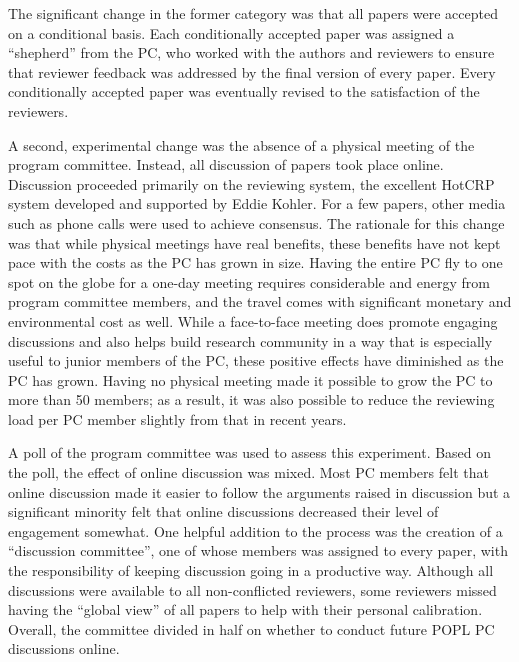 \documentclass[11pt]{article}
\begin{document}
The significant change in the former category was that all papers were
accepted on a conditional basis. Each conditionally accepted paper
was assigned a ``shepherd'' from the PC, who worked with the authors
and reviewers to ensure that reviewer feedback was addressed by the
final version of every paper. Every conditionally accepted paper was
eventually revised to the satisfaction of the reviewers.

A second, experimental change was the absence of a physical meeting of
the program committee. Instead, all discussion of papers took place
online. Discussion proceeded primarily on the reviewing system,
the excellent HotCRP system developed and supported by Eddie Kohler.
For a few papers, other media such as phone calls were used to achieve
consensus. The
rationale for this change was that while physical meetings have real
benefits, these benefits have not kept pace with the costs as the PC
has grown in size.  Having the entire PC fly to one spot on the globe
for a one-day meeting requires considerable and energy from program
committee members, and the travel comes with significant monetary and
environmental cost as well. While a face-to-face meeting does promote
engaging discussions and also helps build research community in a way
that is especially useful to junior members of the PC, these positive
effects have diminished as the PC has grown. Having no physical
meeting made it possible to grow the PC to more than 50 members; as
a result, it was also possible to reduce the reviewing load per PC
member slightly from that in recent years.

A poll of the program committee was used to assess this experiment.
Based on the poll, the effect of online discussion was mixed. Most
PC members felt that online discussion made it easier to follow the
arguments raised in discussion but a significant minority felt that
online discussions decreased their level of engagement somewhat. One
helpful addition to the process was the creation of a ``discussion
committee'', one of whose members was assigned to every paper, with
the responsibility of keeping discussion going in a productive
way. Although all discussions were available to all non-conflicted
reviewers, some reviewers missed having the ``global view'' of all
papers to help with their personal calibration. Overall, the committee
divided in half on whether to conduct future POPL PC discussions
online.
\end{document}
